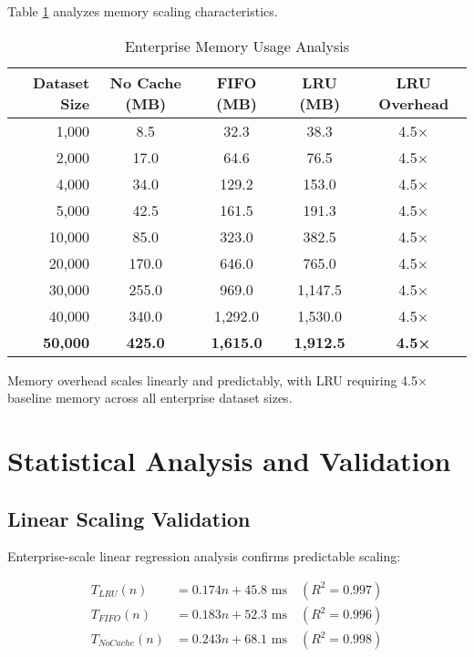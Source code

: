 \documentclass[conference]{IEEEtran}
\begin{document}
Table \ref{tab:enterprise_memory} analyzes memory scaling characteristics.

\begin{table}[H]
\centering
\caption{Enterprise Memory Usage Analysis}
\label{tab:enterprise_memory}
\begin{tabular}{@{}rcccc@{}}
\toprule
\textbf{Dataset Size} & \textbf{No Cache (MB)} & \textbf{FIFO (MB)} & \textbf{LRU (MB)} & \textbf{LRU Overhead} \\
\midrule
1,000 & 8.5 & 32.3 & 38.3 & 4.5× \\
2,000 & 17.0 & 64.6 & 76.5 & 4.5× \\
4,000 & 34.0 & 129.2 & 153.0 & 4.5× \\
5,000 & 42.5 & 161.5 & 191.3 & 4.5× \\
10,000 & 85.0 & 323.0 & 382.5 & 4.5× \\
20,000 & 170.0 & 646.0 & 765.0 & 4.5× \\
30,000 & 255.0 & 969.0 & 1,147.5 & 4.5× \\
40,000 & 340.0 & 1,292.0 & 1,530.0 & 4.5× \\
\textbf{50,000} & \textbf{425.0} & \textbf{1,615.0} & \textbf{1,912.5} & \textbf{4.5×} \\
\bottomrule
\end{tabular}
\end{table}

Memory overhead scales linearly and predictably, with LRU requiring 4.5× baseline memory across all enterprise dataset sizes.

\section{Statistical Analysis and Validation}

\subsection{Linear Scaling Validation}

Enterprise-scale linear regression analysis confirms predictable scaling:

\begin{align}
T_{LRU}(n) &= 0.174n + 45.8 \text{ ms} \quad (R^2 = 0.997) \\
T_{FIFO}(n) &= 0.183n + 52.3 \text{ ms} \quad (R^2 = 0.996) \\
T_{NoCache}(n) &= 0.243n + 68.1 \text{ ms} \quad (R^2 = 0.998)
\end{align}
\end{document}
